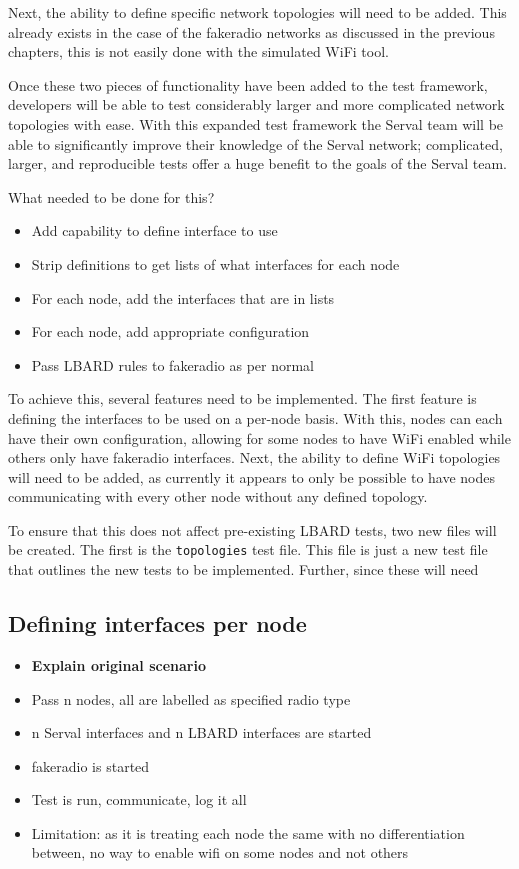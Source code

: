 Next, the ability to define specific network topologies will need to be added.
This already exists in the case of the fakeradio networks as discussed in the previous chapters, this is not easily done with the simulated WiFi tool.

Once these two pieces of functionality have been added to the test framework, developers will be able to test considerably larger and more complicated network topologies with ease.
With this expanded test framework the Serval team will be able to significantly improve their knowledge of the Serval network; complicated, larger, and reproducible tests offer a huge benefit to the goals of the Serval team. 

What needed to be done for this?
\begin{itemize}
    \item Add capability to define interface to use
    \item Strip definitions to get lists of what interfaces for each node
    \item For each node, add the interfaces that are in lists
    \item For each node, add appropriate configuration
    \item Pass LBARD rules to fakeradio as per normal
\end{itemize}


To achieve this, several features need to be implemented. 
The first feature is defining the interfaces to be used on a per-node basis.
With this, nodes can each have their own configuration, allowing for some nodes to have WiFi enabled while others only have fakeradio interfaces.
Next, the ability to define WiFi topologies will need to be added, as currently it appears to only be possible to have nodes communicating with every other node without any defined topology.

To ensure that this does not affect pre-existing LBARD tests, two new files will be created.
The first is the \verb|topologies| test file.
This file is just a new test file that outlines the new tests to be implemented.
Further, since these will need 

\subsection{Defining interfaces per node}
\begin{itemize}
    \item \textbf{Explain original scenario}
    \item Pass n nodes, all are labelled as specified radio type
    \item n Serval interfaces and n LBARD interfaces are started
    \item fakeradio is started
    \item Test is run, communicate, log it all
    \item Limitation: as it is treating each node the same with no differentiation between, no way to enable wifi on some nodes and not others
\end{itemize}

